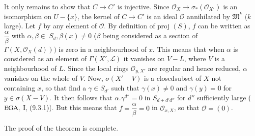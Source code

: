  It only remains to show that $C \to C'$ is injective. Since
 $\mathscr{O}_X \rightarrow \sigma_*(\mathscr{O}_{X'})$ is an
 isomorphism on $U - \{x\}$, the kernel of $C \to C'$ is an ideal
 $\mathscr{O}$ annihilated by $\mathfrak{M}^k$ ($k$ large). Let $f$ by
 any element of $\mathscr{O}$. By definition of proj $(S)$, $f$ can be
 written as $\dfrac{\alpha}{\beta}$ with $\alpha,\beta \in \; S_d,
 \beta(x) \neq 0 $ ($\beta$ being considered as a section of $\Gamma
 (X, \mathscr{O}_X (d)))$ is zero in a neighbourhood of $x$. This
 means that when $\alpha$ is considered as an element of $\Gamma (X',
 \mathscr{L})$ it vanishes on $V-L$, where $V$ is a neighbourhood of
 $L$. Since the local rings $\mathscr{O}_{y, X'}$ are regular and
 hence  reduced, $\alpha$ vanishes on the whole of $V$. Now, $\sigma
 (X' -V)$ is a closed\pageoriginale subset of $X$ not containing $x$,
 so that find a 
 $\gamma \in S_{d'}$ such that $\gamma(x) \neq 0$ and $\gamma (y)=0$
 for $y \in \sigma (X-V)$. It then follows that
 $\alpha. \gamma^{d''}=0$ in $S_{d+d' d''}$ for $d''$ sufficiently
 large ($\operatorname{EGA}$, I, (9.3.1)). But this means that $f=
 \dfrac{\alpha}{\beta}=0$ in $\mathscr{O}_{x,X}$, so that
 $\mathscr{O}= (0)$. 
 
 The proof of the theorem is complete.
 
